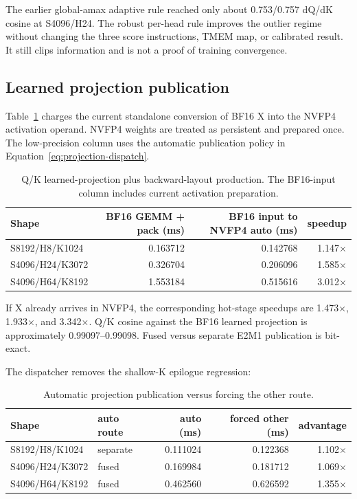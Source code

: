 The earlier global-amax adaptive rule reached only about 0.753/0.757 dQ/dK
cosine at S4096/H24.  The robust per-head rule improves the outlier regime
without changing the three score instructions, TMEM map, or calibrated result.
It still clips information and is not a proof of training convergence.

\subsection{Learned projection publication}

Table~\ref{tab:projection-charged} charges the current standalone conversion
of BF16 X into the NVFP4 activation operand.  NVFP4 weights are treated as
persistent and prepared once.  The low-precision column uses the automatic
publication policy in Equation~\ref{eq:projection-dispatch}.

\begin{table}[htbp]
\centering
\caption{Q/K learned-projection plus backward-layout production.  The
BF16-input column includes current activation preparation.}
\label{tab:projection-charged}
\small
\begin{tabular}{l rrr}
\toprule
Shape & BF16 GEMM + pack (ms) & BF16 input to NVFP4 auto (ms) & speedup \\
\midrule
S8192/H8/K1024  & 0.163712 & 0.142768 & 1.147$\times$ \\
S4096/H24/K3072 & 0.326704 & 0.206096 & 1.585$\times$ \\
S4096/H64/K8192 & 1.553184 & 0.515616 & 3.012$\times$ \\
\bottomrule
\end{tabular}
\end{table}

If X already arrives in NVFP4, the corresponding hot-stage speedups are
1.473$\times$, 1.933$\times$, and 3.342$\times$.  Q/K cosine against the
BF16 learned projection is approximately 0.99097--0.99098.  Fused versus
separate E2M1 publication is bit-exact.

The dispatcher removes the shallow-K epilogue regression:

\begin{table}[htbp]
\centering
\caption{Automatic projection publication versus forcing the other route.}
\label{tab:projection-dispatch-results}
\small
\begin{tabular}{l l rrr}
\toprule
Shape & auto route & auto (ms) & forced other (ms) & advantage \\
\midrule
S8192/H8/K1024  & separate & 0.111024 & 0.122368 & 1.102$\times$ \\
S4096/H24/K3072 & fused    & 0.169984 & 0.181712 & 1.069$\times$ \\
S4096/H64/K8192 & fused    & 0.462560 & 0.626592 & 1.355$\times$ \\
\bottomrule
\end{tabular}
\end{table}

